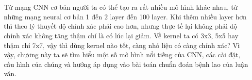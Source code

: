 \setcounter{chapter}{1}
\setcounter{section}{1}
\chapter{\tenchuongii}
Từ mạng CNN cơ bản người ta có thể tạo ra rất nhiều mô hình khác nhau, từ những mạng neural cơ bản 1 đến 2 layer đến 100 layer. Khi thêm nhiều layer hơn thì theo lý thuyết độ chính xác phải cao hơn, nhưng thực tế lại không phải độ chính xác không tăng thậm chí là có lúc lại giảm. Về kernel ta có 3x3, 5x5 hay thậm chí 7x7, vậy thì dùng kernel nào tốt, càng nhỏ liệu có càng chính xác? Vì vậy, chương này ta sẽ tìm hiểu một số mô hình nổi tiếng của CNN, các cài đặt, cấu hình của chúng và hướng áp dụng vào bài toán chuẩn đoán bệnh lao của luận văn.






	 
	 
